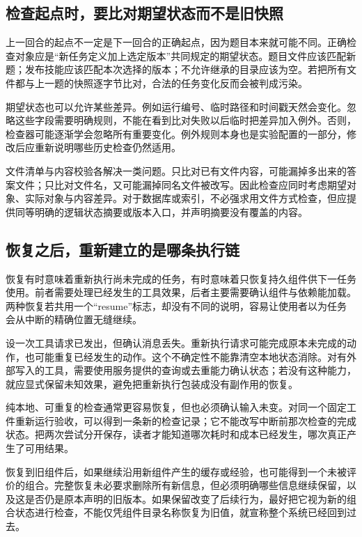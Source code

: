 \subsection{检查起点时，要比对期望状态而不是旧快照}

上一回合的起点不一定是下一回合的正确起点，因为题目本来就可能不同。正确检查对象应是“新任务定义加上选定版本”共同规定的期望状态。题目文件应该匹配新题；发布技能应该匹配本次选择的版本；不允许继承的目录应该为空。若把所有文件都与上一题的快照逐字节比对，合法的任务变化反而会被判成污染。

期望状态也可以允许某些差异。例如运行编号、临时路径和时间戳天然会变化。忽略这些字段需要明确规则，不能在看到比对失败以后临时把差异加入例外。否则，检查器可能逐渐学会忽略所有重要变化。例外规则本身也是实验配置的一部分，修改后应重新说明哪些历史检查仍然适用。

文件清单与内容校验各解决一类问题。只比对已有文件内容，可能漏掉多出来的答案文件；只比对文件名，又可能漏掉同名文件被改写。因此检查应同时考虑期望对象、实际对象与内容差异。对于数据库或索引，不必强求用文件方式检查，但应提供同等明确的逻辑状态摘要或版本入口，并声明摘要没有覆盖的内容。

\subsection{恢复之后，重新建立的是哪条执行链}

恢复有时意味着重新执行尚未完成的任务，有时意味着只恢复持久组件供下一任务使用。前者需要处理已经发生的工具效果，后者主要需要确认组件与依赖能加载。两种恢复若共用一个“resume”标志，却没有不同的说明，容易让使用者以为任务会从中断的精确位置无缝继续。

设一次工具请求已发出，但确认消息丢失。重新执行请求可能完成原本未完成的动作，也可能重复已经发生的动作。这个不确定性不能靠清空本地状态消除。对有外部写入的工具，需要使用服务提供的查询或去重能力确认状态；若没有这种能力，就应显式保留未知效果，避免把重新执行包装成没有副作用的恢复。

纯本地、可重复的检查通常更容易恢复，但也必须确认输入未变。对同一个固定工件重新运行验收，可以得到一条新的检查记录；它不能改写中断前那次检查的完成状态。把两次尝试分开保存，读者才能知道哪次耗时和成本已经发生，哪次真正产生了可用结果。

恢复到旧组件后，如果继续沿用新组件产生的缓存或经验，也可能得到一个未被评价的组合。完整恢复未必要求删除所有新信息，但必须明确哪些信息继续保留，以及这是否仍是原本声明的旧版本。如果保留改变了后续行为，最好把它视为新的组合状态进行检查，不能仅凭组件目录名称恢复为旧值，就宣称整个系统已经回到过去。

